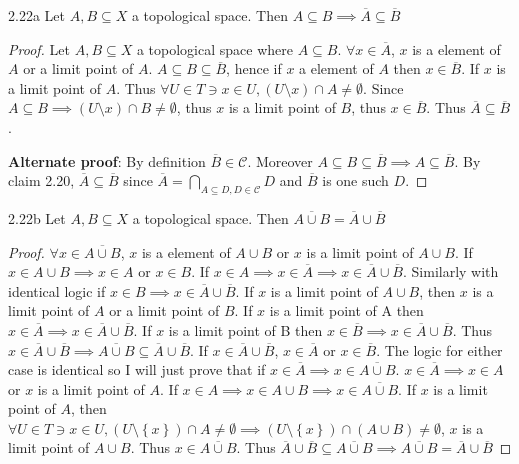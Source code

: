 \documentclass{article}
\begin{document}
\bigskip

\begin{claim}{2.22a}\label{Claim 2.22a.}
    Let $A, B \subseteq X$ a topological space. Then $A \subseteq B \implies \overline{A} \subseteq \overline{B}$   
\end{claim}
\begin{proof}
    Let $A, B \subseteq X$ a topological space where $A \subseteq B$. $\forall x \in \overline{A}$, $x$ is a element of $A$ or a limit point of $A$. $A \subseteq B \subseteq \overline{B}$, hence if $x$ a element of $A$ then $x \in \overline{B}$. If $x$ is a limit point of $A$. Thus $\forall U \in T \ni x \in U, \left(U \setminus x\right)\cap A \neq \emptyset$. Since $A \subseteq B \implies \left(U \setminus x\right)\cap B \neq \emptyset$, thus $x$ is a limit point of $B$, thus $x \in \overline{B}$. Thus $\overline{A} \subseteq \overline{B}$. 
    
    \textbf{Alternate proof}: By definition $\overline{B} \in \mathcal{C}$. Moreover $A \subseteq B \subseteq \overline{B} \implies A \subseteq \overline{B}$. By claim 2.20, $\overline{A} \subseteq \overline{B}$ since $\overline{A} = \bigcap_{A \subseteq D, D \in \mathcal{C}} D$ and $\overline{B}$ is one such $D$.            
\end{proof}
\begin{claim}{2.22b}\label{Claim 2.22b.}
    Let $A, B \subseteq X$ a topological space. Then $\overline{A \cup B} = \overline{A} \cup \overline{B}$
\end{claim}
\begin{proof}
    $\forall x \in \overline{A \cup B}$, $x$ is a element of $A \cup B$ or $x$ is a limit point of $A \cup B$. If $x \in A \cup B \implies x \in A$ or $x \in B$. If $x \in A \implies x \in \overline{A} \implies x \in \overline{A} \cup \overline{B}$. Similarly with identical logic if $x \in B \implies x\in \overline{A} \cup \overline{B}$. If $x$ is a limit point of $A \cup B$, then $x$ is a limit point of $A$ or a limit point of $B$. If $x$ is a limit point of A then $x \in \overline{A} \implies x \in \overline{A} \cup \overline{B}$. If $x$ is a limit point of B then $x \in \overline{B}  \implies x \in \overline{A} \cup \overline{B}$. Thus $x \in \overline{A} \cup \overline{B} \implies \overline{A \cup B} \subseteq \overline{A} \cup \overline{B}$. If $x \in \overline{A} \cup \overline{B}$, $x \in \overline{A}$ or $x \in \overline{B}$. The logic for either case is identical so I will just prove that if $x \in \overline{A} \implies x \in \overline{A \cup B}$. $x \in \overline{A} \implies x\in A$ or $x$ is a limit point of $A$. If $x \in A \implies x \in A \cup B \implies x \in \overline{A \cup B}$. If $x$ is a limit point of $A$, then $\forall U \in T \ni x \in U, \left(U \setminus \left\{ x \right\}\right) \cap A \neq \emptyset \implies (U \setminus \left\{ x \right\}) \cap (A \cup B) \neq \emptyset$, $x$ is a limit point of $A \cup B$. Thus $x \in \overline{A \cup B}$. Thus $\overline{A} \cup \overline{B}\subseteq \overline{A \cup B} \implies \overline{A \cup B} = \overline{A} \cup \overline{B}$

\end{proof}
\end{document}
